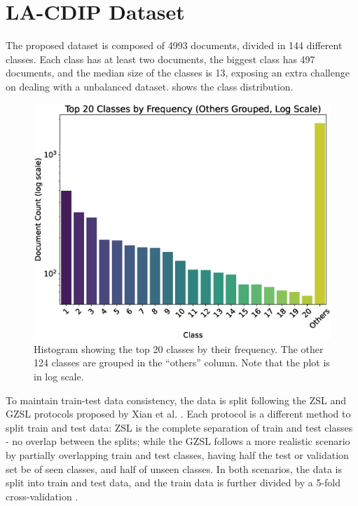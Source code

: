 \section{LA-CDIP Dataset}
\label{sec:dataset}

The proposed dataset is composed of 4993 documents, divided in 144 different classes. Each class has at least two documents, the biggest class has 497 documents, and the median size of the classes is 13, exposing an extra challenge on dealing with a unbalanced dataset.  shows the class distribution.

\begin{figure}[htbp]
\centering
\includegraphics[width=.8\textwidth]{images/hist2.eps}
\caption{Histogram showing the top 20 classes by their frequency. The other 124 classes are grouped in the ``others'' column. Note that the plot is in log scale.}
\label{fig:histplot}
\end{figure}  

To maintain train-test data consistency, the data is split following the \gls{ZSL} and \gls{GZSL} protocols proposed by Xian et al. \cite{xian_zero-shot_2019}. Each protocol is a different method to split train and test data: \gls{ZSL} is the complete separation of train and test classes - no overlap between the splits; while the \gls{GZSL} follows a more realistic scenario by partially overlapping train and test classes, having half the test or validation set be of seen classes, and half of unseen classes. In both scenarios, the data is split into train and test data, and the train data is further divided by a 5-fold cross-validation \cite{wong_reliable_2019}.

